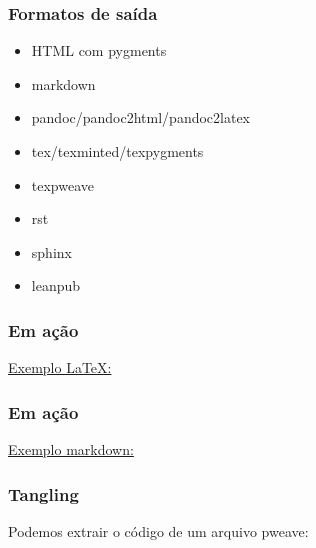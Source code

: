 \documentclass{beamer}
\begin{document}
\begin{frame}
  \frametitle{Formatos de saída}
  \begin{itemize}
  \item HTML com pygments
  \item markdown
  \item pandoc/pandoc2html/pandoc2latex
  \item tex/texminted/texpygments
  \item texpweave
  \item rst
  \item sphinx
  \item leanpub
  \end{itemize}
\end{frame}

\begin{frame}[fragile]
  \frametitle{Em ação}
  \href{exemplos/exemplo.texw}{Exemplo \LaTeX: }

  \begin{center}
  \end{center}
\end{frame}

\begin{frame}[fragile]
  \frametitle{Em ação}
  \href{exemplos/fird.mdw}{Exemplo markdown: }

  \begin{center}
  \end{center}
\end{frame}

\begin{frame}
  \frametitle{Tangling}
  Podemos extrair o código de um arquivo pweave:

  \begin{center}
  \end{center}
\end{frame}
\end{document}
